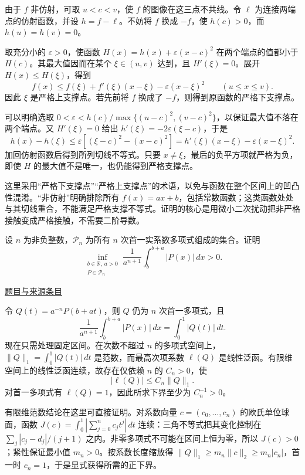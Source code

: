 \documentclass[UTF8,12pt,a4paper,fontset=fandol]{ctexart}
\begin{document}
\begin{solve}\label{ans:fin04-all:4}

由于 $f$ 非仿射，可取 $u<c<v$，使 $f$ 的图像在这三点不共线。令 $\ell$ 为连接两端点的仿射函数，并设 $h=f-\ell$。不妨将 $f$ 换成 $-f$，使 $h(c)>0$，而 $h(u)=h(v)=0$。

取充分小的 $\varepsilon>0$，使函数
$H(x)=h(x)+\varepsilon(x-c)^2$ 在两个端点的值都小于 $H(c)$。其最大值因而在某个 $\xi\in(u,v)$ 达到，且 $H'(\xi)=0$。展开 $H(x)\le H(\xi)$，得到
\[
f(x)\le f(\xi)+f'(\xi)(x-\xi)-\varepsilon(x-\xi)^2
\qquad(u\le x\le v).
\]
因此 $\xi$ 是严格上支撑点。若先前将 $f$ 换成了 $-f$，则得到原函数的严格下支撑点。

可以明确选取 $0<\varepsilon<h(c)/\max\{(u-c)^2,(v-c)^2\}$，以保证最大值不落在两个端点。又 $H'(\xi)=0$ 给出 $h'(\xi)=-2\varepsilon(\xi-c)$，于是
\[
h(x)-h(\xi)\le\varepsilon[(\xi-c)^2-(x-c)^2]
=h'(\xi)(x-\xi)-\varepsilon(x-\xi)^2.
\]
加回仿射函数后得到所列切线不等式。只要 $x\ne\xi$，最后的负平方项就严格为负，即使 $H$ 的最大值不是唯一，也仍能得到严格支撑点。

\end{solve}

\begin{remark}[方法与条件]这里采用“严格下支撑点”“严格上支撑点”的术语，以免与函数在整个区间上的凹凸性混淆。“非仿射”明确排除所有 $f(x)=ax+b$，包括常数函数；这类函数处处与其切线重合，不能满足严格支撑不等式。证明的核心是用微小二次扰动把非严格接触变成严格接触，不需要二阶导数。\end{remark}

\begin{example}[来源序号6]\label{ex:fin04-all:6}\label{pr:fin04-all:6}

设 $n$ 为非负整数，$\mathcal P_n$ 为所有 $n$ 次首一实系数多项式组成的集合。证明
\[
\inf_{\substack{b\in\mathbb R,\ a>0\\P\in\mathcal P_n}}
\frac1{a^{n+1}}\int_b^{b+a}|P(x)|\,dx>0.
\]

\par\href{https://github.com/lzxcr/cmc-mathematics/blob/64916fa1fdbc3e444a652eca204d5669058ee321/src/problems/finals/04/06.md}{题目与来源条目}

\end{example}

\begin{solve}\label{ans:fin04-all:6}

令 $Q(t)=a^{-n}P(b+at)$，则 $Q$ 仍为 $n$ 次首一多项式，且
\[
\frac1{a^{n+1}}\int_b^{b+a}|P(x)|\,dx=\int_0^1|Q(t)|\,dt.
\]
现在只需处理固定区间。在次数不超过 $n$ 的多项式空间上，
$\|Q\|_1=\int_0^1|Q(t)|\,dt$ 是范数，而最高次项系数 $\ell(Q)$ 是线性泛函。有限维空间上的线性泛函连续，故存在仅依赖 $n$ 的 $C_n>0$，使
\[
|\ell(Q)|\le C_n\|Q\|_1.
\]
对首一多项式有 $\ell(Q)=1$，因此所求下界至少为 $C_n^{-1}>0$。

有限维范数结论在这里可直接证明。对系数向量 $c=(c_0,\ldots,c_n)$ 的欧氏单位球面，函数 $J(c)=\int_0^1|\sum_{j=0}^nc_jt^j|\,dt$ 连续：三角不等式把其变化控制在 $\sum_j|c_j-d_j|/(j+1)$ 之内。非零多项式不可能在区间上恒为零，所以 $J(c)>0$；紧性保证最小值 $m_n>0$。按系数长度缩放得 $\|Q\|_1\ge m_n\|c\|_2\ge m_n|c_n|$，首一时 $c_n=1$，于是显式获得所需的正下界。

\end{solve}
\end{document}
